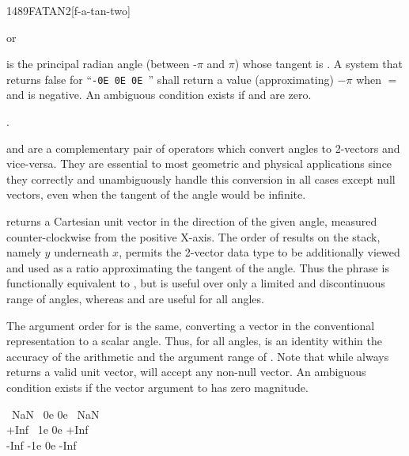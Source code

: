 
\begin{worddef}{1489}{FATAN2}[f-a-tan-two]
\item {} or

	 is the principal radian angle (between -$\pi$ and $\pi$)
	whose tangent is .
	A system that returns false for ``\texttt{-0E 0E 0E }''
	shall return a value (approximating) $-\pi$ when  $=$ 
	and  is negative.
	An ambiguous condition exists if  and  are
	zero.

\see {}.

	\begin{rationale} %
		 and  are a complementary pair of
		operators which convert angles to 2-vectors and vice-versa.
		They are essential to most geometric and physical applications
		since they correctly and unambiguously handle this conversion
		in all cases except null vectors, even when the tangent of the
		angle would be infinite.

		 returns a Cartesian unit vector in the direction
		of the given angle, measured counter-clockwise from the positive
		X-axis. The order of results on the stack, namely $y$ underneath
		$x$, permits the 2-vector data type to be additionally viewed
		and used as a ratio approximating the tangent of the angle.
		Thus the phrase   is functionally
		equivalent to , but is useful over only a limited
		and discontinuous range of angles, whereas  and
		 are useful for all angles.

		The argument order for  is the same, converting a
		vector in the conventional representation to a scalar angle.
		Thus, for all angles,   is an identity
		within the accuracy of the arithmetic and the argument range of
		. Note that while  always returns a
		valid unit vector,  will accept any non-null vector.
		An ambiguous condition exists if the vector argument to
		 has zero magnitude.
	\end{rationale}

	\begin{testing}\ttfamily
		\word[tools]{[UNDEFINED]} ~NaN \word[tools]{[IF]} ~0e 0e   ~NaN \word[tools]{[THEN]} \\
		\word[tools]{[UNDEFINED]} +Inf \word[tools]{[IF]} ~1e 0e   +Inf \word[tools]{[THEN]} \\
		\word[tools]{[UNDEFINED]} -Inf \word[tools]{[IF]} -1e 0e   -Inf \word[tools]{[THEN]}


\end{testing}
\end{worddef}
